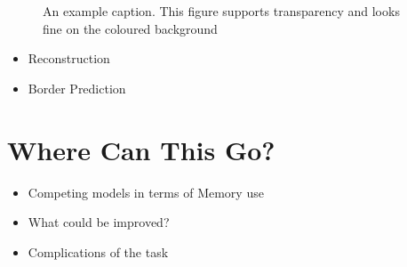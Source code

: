 \documentclass[
]{dtuposter}
\begin{document}
\begin{dtupostercontent}
\begin{figure}
	\begin{fadebox}\centering
{}
\end{fadebox}
\caption{An example caption. This figure supports transparency and looks fine on 
the coloured background}\label{fig:example}
\end{figure}

\begin{itemize}
	\item Reconstruction
	\item Border Prediction
\end{itemize}


\section{Where Can This Go?}
\begin{itemize}
	\item Competing models in terms of Memory use
	\item What could be improved?
	\item Complications of the task
\end{itemize}


\end{dtupostercontent}
\end{document}
